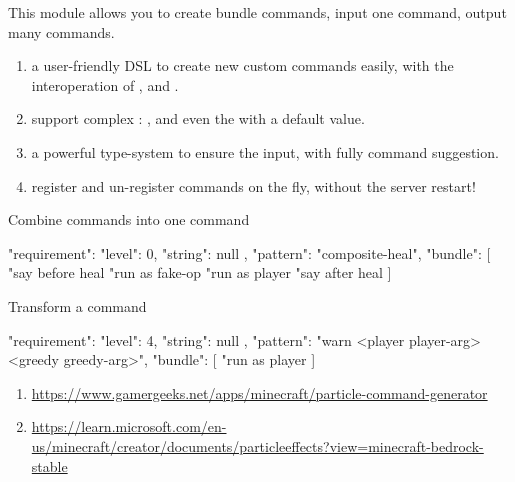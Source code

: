 \label{chap:command_bundle}

This module allows you to create bundle commands, input one command, output many commands.


\begin{enumerate}
    \item {a user-friendly DSL to create new custom commands easily, with the interoperation of ,  and .}
    \item {support complex : ,  and even the  with a default value.}
    \item {a powerful type-system to ensure the  input, with fully command suggestion.}
    \item {register and un-register commands on the fly, without the server restart!}
\end{enumerate}

\begin{example}{Combine commands into one command}
    \begin{json}
    {
        "requirement": {
        "level": 0,
        "string": null
    },
        "pattern": "composite-heal",
        "bundle": [
        "say before heal %
        "run as fake-op %
        "run as player %
        "say after heal %
        ]
    }
    \end{json}
\end{example}

\begin{example}{Transform a command}
    \begin{json}
    {
        "requirement": {
        "level": 4,
        "string": null
    },
        "pattern": "warn <player player-arg> <greedy greedy-arg>",
        "bundle": [
        "run as player %
        ]
    }
    \end{json}
\end{example}

\begin{enumerate}
    \item \url{https://www.gamergeeks.net/apps/minecraft/particle-command-generator}
    \item \url{https://learn.microsoft.com/en-us/minecraft/creator/documents/particleeffects?view=minecraft-bedrock-stable}
\end{enumerate}
